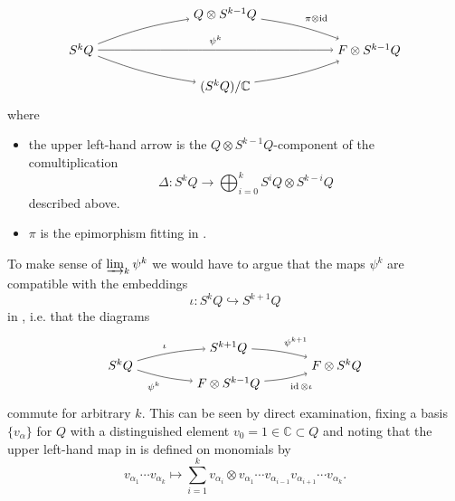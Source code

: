 \documentclass[11pt]{article}
\theoremstyle{plain}
\theoremstyle{nonumberplain}
\theoremstyle{plain}
\numberwithin{equation}{section}
\theoremstyle{nonumberplain}
\newcommand\bC{{\mathbb C}}
\newcommand\1{{\bf 1}}
\DeclareMathOperator{\id}{id}
\begin{document}
\begin{equation}\label{eq:3}
  \begin{tikzpicture}[auto,baseline=(current  bounding  box.center)]
    \path[anchor=base] (0,0) node (1) {$S^{k}Q$}
    +(4,1) node (2) {$Q\otimes S^{k-1}Q$}
    +(8,0) node (3) {$F\otimes S^{k-1}Q$}
    +(4,-1) node (4) {($S^{k}Q)/\bC$};
    \draw[->] (1) to[bend left=6] node[pos=.5,auto] {$\scriptstyle $} (2);
    \draw[->] (2) to[bend left=6] node[pos=.5,auto] {$\scriptstyle \pi\otimes\id$} (3);
    \draw[->] (1) to[bend right=6] node[pos=.5,auto,swap] {$\scriptstyle $} (4);
    \draw[->] (4) to[bend right=6] node[pos=.5,auto,swap] {$\scriptstyle $} (3);
    \draw[->] (1) to[bend right=0] node[pos=.5,auto] {$\scriptstyle \psi^k$} (3);    
  \end{tikzpicture}
\end{equation}
where
\begin{itemize}
\item[$-$] the upper left{-}hand arrow is the $Q\otimes S^{k-1}Q$-component of the comultiplication
  \begin{equation*}
    \Delta:S^kQ\to \bigoplus_{i=0}^k S^iQ\otimes S^{k-i}Q
  \end{equation*}
  described above.
\item[$-$] $\pi$ is the epimorphism fitting in .
\end{itemize}

To make sense of $\varinjlim_k \psi^k$ we would have to argue that the maps $\psi^k$ are compatible with the embeddings
\begin{equation*}
  \iota:S^kQ\hookrightarrow S^{k+1}Q
\end{equation*}
in , i.e. that the diagrams
\begin{equation*}
 \begin{tikzpicture}[auto,baseline=(current  bounding  box.center)]
  \path[anchor=base] 
  (0,0) node (l) {$S^kQ$} 
  +(6,0) node (r) {$F\otimes S^{k}Q$}
  +(3,.5) node (u) {$S^{k+1}Q$}
  +(3,-.5) node (d) {$F\otimes S^{k-1}Q$}
  ;
  \draw[->] (l) to[bend left=6] node[pos=.5,auto] {$\scriptstyle \iota$} (u);
  \draw[->] (u) to[bend left=6] node[pos=.5,auto] {$\scriptstyle \psi^{k+1}$} (r);
  \draw[->] (l) to[bend right=6] node[pos=.5,auto,swap] {$\scriptstyle \psi^k$} (d);
  \draw[->] (d) to[bend right=6] node[pos=.5,auto,swap] {$\scriptstyle \id\otimes\iota$} (r);  
 \end{tikzpicture}
\end{equation*}
commute for arbitrary $k$. This can be seen by direct examination, fixing a basis $\{v_{\alpha}\}$ for $Q$ with a distinguished element $v_0=1\in \bC\subset Q$ and noting that the upper left{-}hand map in  is defined on monomials by
\begin{equation}\label{eq:expldelta}
  v_{\alpha_1}\cdots v_{\alpha_k}\mapsto \sum_{i=1}^k v_{\alpha_i}\otimes v_{\alpha_1}\cdots v_{\alpha_{i-1}}v_{\alpha_{i+1}}\cdots v_{\alpha_k}. 
\end{equation}
\end{document}
